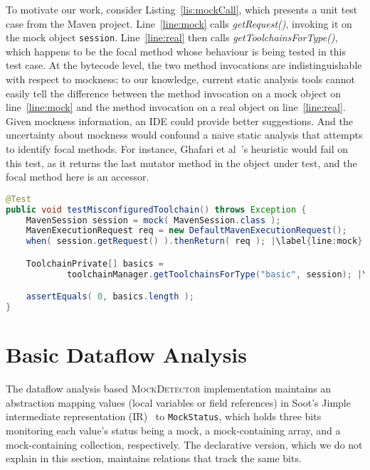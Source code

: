 To motivate our work, consider Listing~\ref{lis:mockCall}, which presents a unit test case from the Maven project. Line~\ref{line:mock} calls \textit{getRequest()}, invoking it on the mock object \texttt{session}. Line~\ref{line:real} then calls \textit{getToolchainsForType()}, which happens to be the focal method whose behaviour is being tested in this test case. At the bytecode level, the two method invocations are indistinguishable with respect to mockness; to our knowledge, current static analysis tools cannot easily tell the difference between the method invocation on a mock object on line~\ref{line:mock} and the method invocation on a real object on line~\ref{line:real}. Given mockness information, an IDE could provide better suggestions. And the uncertainty about mockness would confound a naive static analysis that attempts to identify focal methods. For instance, Ghafari et al~\cite{ghafari15:_autom}'s heuristic would fail on this test, as it returns the last mutator method in the object under test, and the focal method here is an accessor.

\begin{lstlisting}[basicstyle=\ttfamily, caption={This code snippet illustrates an example from maven-core, where calls to both the focal method \texttt{getToolchainsForType()} and to mock \texttt{session}'s \texttt{getRequest()} method occur in test \textit{testMisconfiguredToolchain()}.},
basicstyle=\ttfamily,language = Java, framesep=4.5mm, escapechar=|,
framexleftmargin=1.0mm, captionpos=b, label=lis:mockCall, morekeywords={@Test}]
@Test
public void testMisconfiguredToolchain() throws Exception {
	MavenSession session = mock( MavenSession.class );
	MavenExecutionRequest req = new DefaultMavenExecutionRequest();
	when( session.getRequest() ).thenReturn( req ); |\label{line:mock}|

	ToolchainPrivate[] basics =
			toolchainManager.getToolchainsForType("basic", session); |\label{line:real}|

	assertEquals( 0, basics.length );
}
\end{lstlisting}

\section{Basic Dataflow Analysis} 

The dataflow analysis based \textsc{MockDetector} implementation maintains an abstraction mapping values (local variables or field references) in Soot's Jimple intermediate representation (IR)~\cite{Vallee-Rai:1999:SJB:781995.782008} to \texttt{MockStatus}, which holds three bits monitoring each value's status being a mock, a mock-containing array, and a mock-containing collection, respectively. The declarative version, which we do not explain in this section, maintains relations that track the same bits.

